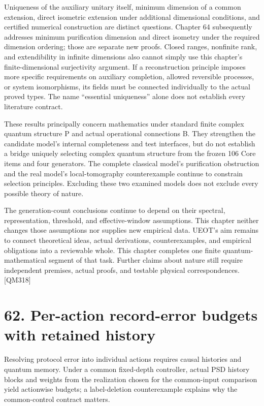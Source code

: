 \documentclass[
  11pt,
  oneside]{book}
\begin{document}
Uniqueness of the auxiliary unitary itself, minimum dimension of a
common extension, direct isometric extension under additional
dimensional conditions, and certified numerical construction are
distinct questions. Chapter 64 subsequently addresses minimum
purification dimension and direct isometry under the required dimension
ordering; those are separate new proofs. Closed ranges, nonfinite rank,
and extendibility in infinite dimensions also cannot simply use this
chapter's finite-dimensional surjectivity argument. If a reconstruction
principle imposes more specific requirements on auxiliary completion,
allowed reversible processes, or system isomorphisms, its fields must be
connected individually to the actual proved types. The name ``essential
uniqueness'' alone does not establish every literature contract.

These results principally concern mathematics under standard finite
complex quantum structure P and actual operational connections B. They
strengthen the candidate model's internal completeness and test
interfaces, but do not establish a bridge uniquely selecting complex
quantum structure from the frozen 106 Core items and four generators.
The complete classical model's purification obstruction and the real
model's local-tomography counterexample continue to constrain selection
principles. Excluding these two examined models does not exclude every
possible theory of nature.

The generation-count conclusions continue to depend on their spectral,
representation, threshold, and effective-window assumptions. This
chapter neither changes those assumptions nor supplies new empirical
data. UEOT's aim remains to connect theoretical ideas, actual
derivations, counterexamples, and empirical obligations into a
reviewable whole. This chapter completes one finite quantum-mathematical
segment of that task. Further claims about nature still require
independent premises, actual proofs, and testable physical
correspondences. {[}QM318{]}

\chapter{62. Per-action record-error budgets with retained
history}\label{ch-62}

Resolving protocol error into individual actions requires causal
histories and quantum memory. Under a common fixed-depth controller,
actual PSD history blocks and weights from the realization chosen for
the common-input comparison yield actionwise budgets; a label-deletion
counterexample explains why the common-control contract matters.
\end{document}
